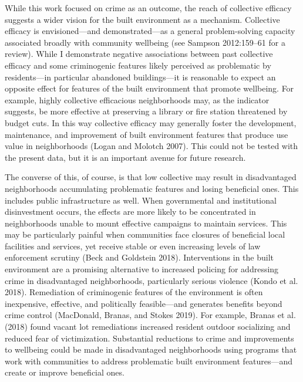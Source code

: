 \documentclass [11pt, proquest] {uwthesis}[2015/03/03]
\begin{document}
While this work focused on crime as an outcome, the reach of collective efficacy suggests a wider vision for the built environment as a mechanism. Collective efficacy is envisioned---and demonstrated---as a general problem-solving capacity associated broadly with community wellbeing (see Sampson 2012:159--61 for a review). While I demonstrate negative associations between past collective efficacy and some criminogenic features likely perceived as problematic by residents---in particular abandoned buildings---it is reasonable to expect an opposite effect for features of the built environment that promote wellbeing. For example, highly collective efficacious neighborhoods may, as the indicator suggests, be more effective at preserving a library or fire station threatened by budget cuts. In this way collective efficacy may generally foster the development, maintenance, and improvement of built environment features that produce use value in neighborhoods (Logan and Molotch 2007). This could not be tested with the present data, but it is an important avenue for future research.

The converse of this, of course, is that low collective may result in disadvantaged neighborhoods accumulating problematic features and losing beneficial ones. This includes public infrastructure as well. When governmental and institutional disinvestment occurs, the effects are more likely to be concentrated in neighborhoods unable to mount effective campaigns to maintain services. This may be particularly painful when communities face closures of beneficial local facilities and services, yet receive stable or even increasing levels of law enforcement scrutiny (Beck and Goldstein 2018). Interventions in the built environment are a promising alternative to increased policing for addressing crime in disadvantaged neighborhoods, particularly serious violence (Kondo et al. 2018). Remediation of criminogenic features of the environment is often inexpensive, effective, and politically feasible---and generates benefits beyond crime control (MacDonald, Branas, and Stokes 2019). For example, Branas et al. (2018) found vacant lot remediations increased resident outdoor socializing and reduced fear of victimization. Substantial reductions to crime and improvements to wellbeing could be made in disadvantaged neighborhoods using programs that work with communities to address problematic built environment features---and create or improve beneficial ones.
\end{document}
